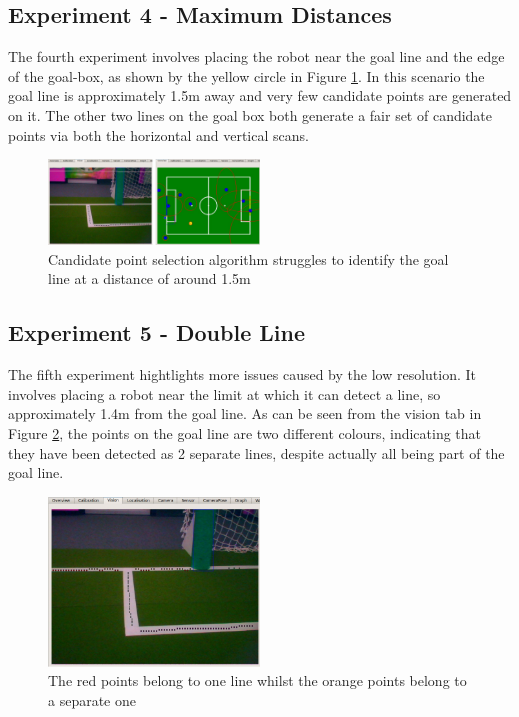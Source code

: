 \documentclass{article}
\begin{document}
\subsection{Experiment 4 - Maximum Distances}
The fourth experiment involves placing the robot near the goal line and the edge of the goal-box, as shown by the yellow circle in Figure \ref{fig:exp4}. In this scenario the goal line is approximately 1.5m away and very few candidate points are generated on it. The other two lines on the goal box both generate a fair set of candidate points via both the horizontal and vertical scans.

\begin{figure}[h]
\centering
\includegraphics[width=0.5\textwidth]{Pictures/candidateT2.png}
\caption{Candidate point selection algorithm struggles to identify the goal line at a distance of around 1.5m}
\label{fig:exp4}
\end{figure}


\subsection{Experiment 5 - Double Line}
The fifth experiment hightlights more issues caused by the low resolution. It involves placing a robot near the limit at which it can detect a line, so approximately 1.4m from the goal line. As can be seen from the vision tab in Figure \ref{fig:exp5}, the points on the goal line are two different colours, indicating that they have been detected as 2 separate lines, despite actually all being part of the goal line.

\begin{figure}[H]
\centering
\includegraphics[width=0.5\textwidth]{Pictures/doubleLine.jpg}
\caption{The red points belong to one line whilst the orange points belong to a separate one}
\label{fig:exp5}
\end{figure}
\end{document}
